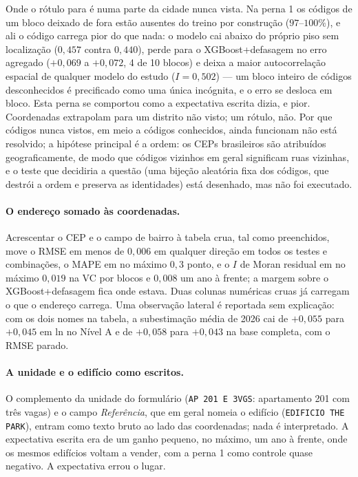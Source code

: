 \documentclass[11pt,a4paper]{article}
\begin{document}
Onde o rótulo para é numa parte da cidade nunca vista. Na perna 1 os códigos de um bloco
deixado de fora estão ausentes do treino por construção ($97$--$100\%$), e ali o código carrega
pior do que nada: o modelo cai abaixo do próprio piso sem localização ($0{,}457$ contra
$0{,}440$), perde para o XGBoost+defasagem no erro agregado ($+0{,}069$ a $+0{,}072$, 4 de 10
blocos) e deixa a maior autocorrelação espacial de qualquer modelo do estudo ($I = 0{,}502$)
--- um bloco inteiro de códigos desconhecidos é precificado como uma única incógnita, e o erro
se desloca em bloco. Esta perna se comportou como a expectativa escrita dizia, e pior.
Coordenadas extrapolam para um distrito não visto; um rótulo, não. Por que códigos nunca
vistos, em meio a códigos conhecidos, ainda funcionam não está resolvido; a hipótese principal
é a ordem: os CEPs brasileiros são atribuídos geograficamente, de modo que códigos vizinhos em
geral significam ruas vizinhas, e o teste que decidiria a questão (uma bijeção aleatória fixa
dos códigos, que destrói a ordem e preserva as identidades) está desenhado, mas não foi
executado.

\paragraph{O endereço somado às coordenadas.} Acrescentar o CEP e o campo de bairro à tabela
crua, tal como preenchidos, move o RMSE em menos de $0{,}006$ em qualquer direção em todos os testes
e combinações, o MAPE em no máximo $0{,}3$ ponto, e o $I$ de Moran residual em no máximo
$0{,}019$ na VC por blocos e $0{,}008$ um ano à frente; a margem sobre o XGBoost+defasagem fica
onde estava. Duas colunas numéricas cruas já carregam o
que o endereço carrega. Uma observação lateral é reportada sem explicação: com os dois nomes na
tabela, a subestimação média de 2026 cai de $+0{,}055$ para $+0{,}045$ em ln no Nível A e de
$+0{,}058$ para $+0{,}043$ na base completa, com o RMSE parado.

\paragraph{A unidade e o edifício como escritos.} O complemento da unidade do formulário
(\texttt{AP 201 E 3VGS}: apartamento 201 com três vagas) e o campo \emph{Referência}, que em
geral nomeia o edifício (\texttt{EDIFICIO THE PARK}), entram como texto bruto ao lado das
coordenadas; nada é interpretado. A expectativa escrita era de um ganho pequeno, no máximo, um
ano à frente, onde os mesmos edifícios voltam a vender, com a perna 1 como controle
quase negativo. A expectativa errou o lugar.
\end{document}
